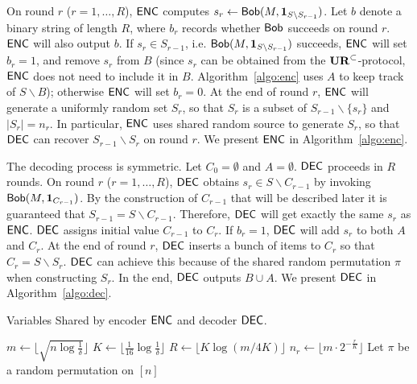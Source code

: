On round $r$ ($r=1,\ldots, R$), $\textsf{ENC}$ computes $s_r\leftarrow \mathsf{Bob}(M, \mathbf{1}_{S\backslash S_{r-1}})$. 
Let $b$ denote a binary string of length $R$, where $b_r$ records whether $\mathsf{Bob}$ succeeds on round $r$. 
$\textsf{ENC}$ will also output $b$. 
If $s_r\in S_{r-1}$, i.e. $\mathsf{Bob}(M, \mathbf{1}_{S\backslash S_{r-1}})$ succeeds, $\textsf{ENC}$ will set $b_r=1$, and remove $s_r$ from $B$ 
(since $s_r$ can be obtained from the $\mathbf{UR}^\subset$-protocol, $\textsf{ENC}$ does not need to include it in $B$. Algorithm~\ref{algo:enc} uses $A$ to keep track of $S\backslash B$); 
otherwise $\textsf{ENC}$ will set $b_r=0$.
At the end of round $r$, $\textsf{ENC}$ will generate a uniformly random set $S_r$, so that $S_r$ is a subset of $S_{r-1}\backslash \{s_r\}$ and $|S_r|=n_r$. 
In particular, $\textsf{ENC}$ uses shared random source to generate $S_r$, so that $\textsf{DEC}$ can recover $S_{r-1}\backslash S_r$ on round $r$. 
We present $\textsf{ENC}$ in Algorithm~\ref{algo:enc}.

The decoding process is symmetric. 
Let $C_0=\emptyset$ and $A=\emptyset$. 
$\textsf{DEC}$ proceeds in $R$ rounds. 
On round $r$ ($r=1,\ldots,R$), $\textsf{DEC}$ obtains $s_r\in S\backslash C_{r-1}$ by invoking $\mathsf{Bob}(M, \mathbf{1}_{C_{r-1}})$. 
By the construction of $C_{r-1}$ that will be described later it is guaranteed that $S_{r-1}=S\backslash C_{r-1}$. 
Therefore, $\textsf{DEC}$ will get exactly the same $s_r$ as $\textsf{ENC}$. 
$\textsf{DEC}$ assigns initial value $C_{r-1}$ to $C_r$.
If $b_r=1$, $\textsf{DEC}$ will add $s_r$ to both $A$ and $C_r$.
At the end of round $r$, $\textsf{DEC}$ inserts a bunch of items to $C_r$ so that $C_r=S\backslash S_r$. 
$\textsf{DEC}$ can achieve this because of the shared random permutation $\pi$ when constructing $S_r$.
In the end, $\textsf{DEC}$ outputs $B\cup A$.
We present $\textsf{DEC}$ in Algorithm~\ref{algo:dec}.

\begin{algorithm}[H] 
  \caption{Variables Shared by encoder $\textsf{ENC}$ and decoder $\textsf{DEC}$.} \label{algo:para}
  \begin{algorithmic}[1] 
    \State $m\leftarrow \lfloor \sqrt{n \log\frac{1}{\delta}} \rfloor$ 
    \State $K\leftarrow \lfloor \frac{1}{16}\log \frac{1}{\delta} \rfloor$
    \State $R\leftarrow \lfloor K\log(m/4K) \rfloor$
      \State $n_r\leftarrow \lfloor m \cdot 2^{-\frac{r}{K}} \rfloor$ 
    \EndFor
    \State Let $\pi$ be a random permutation on $[n]$ 
  \end{algorithmic}
\end{algorithm}

